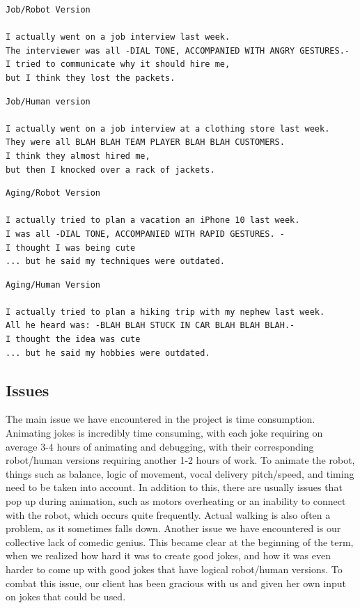 \documentclass[onecolumn, draftclsnofoot,10pt, compsoc]{IEEEtran}
\begin{document}
\begin{lstlisting}
Job/Robot Version

I actually went on a job interview last week.
The interviewer was all -DIAL TONE, ACCOMPANIED WITH ANGRY GESTURES.-
I tried to communicate why it should hire me,
but I think they lost the packets.
\end{lstlisting}

\begin{lstlisting}
Job/Human version

I actually went on a job interview at a clothing store last week.
They were all BLAH BLAH TEAM PLAYER BLAH BLAH CUSTOMERS.
I think they almost hired me,
but then I knocked over a rack of jackets.
\end{lstlisting}

\begin{lstlisting}
Aging/Robot Version

I actually tried to plan a vacation an iPhone 10 last week.
I was all -DIAL TONE, ACCOMPANIED WITH RAPID GESTURES. -
I thought I was being cute
... but he said my techniques were outdated.
\end{lstlisting}

\begin{lstlisting}
Aging/Human Version

I actually tried to plan a hiking trip with my nephew last week.
All he heard was: -BLAH BLAH STUCK IN CAR BLAH BLAH BLAH.-
I thought the idea was cute
... but he said my hobbies were outdated.

\end{lstlisting}


\subsection{Issues}
The main issue we have encountered in the project is time consumption.
Animating jokes is incredibly time consuming, with each joke requiring on average 3-4 hours of animating and debugging, with their corresponding robot/human versions requiring another 1-2 hours of work. To animate the robot, things such as balance, logic of movement, vocal delivery pitch/speed, and timing need to be taken into account. In addition to this, there are usually issues that pop up during animation, such as motors overheating or an inability to connect with the robot, which occurs quite frequently. Actual walking is also often a problem, as it sometimes falls down.
Another issue we have encountered is our collective lack of comedic genius. This became clear at the beginning of the term, when we realized how hard it was to create good jokes, and how it was even harder to come up with good jokes that have logical robot/human versions. To combat this issue, our client has been gracious with us and given her own input on jokes that could be used.
\end{document}
